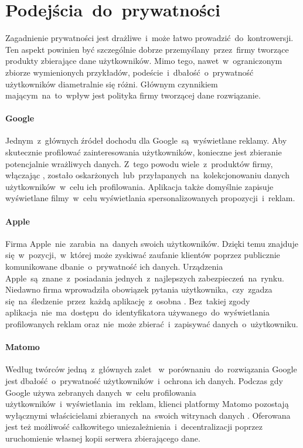 \section{Podejścia~do~prywatności}
Zagadnienie prywatności jest drażliwe~i~może łatwo prowadzić~do~kontrowersji. Ten aspekt powinien być szczególnie dobrze przemyślany~przez~firmy tworzące produkty zbierające dane użytkowników. Mimo tego, nawet~w~ograniczonym zbiorze wymienionych przykładów, podeście~i~dbałość~o~prywatność użytkowników diametralnie się różni. Głównym czynnikiem mającym~na~to~wpływ jest polityka firmy tworzącej dane rozwiązanie.

\paragraph{Google}
Jednym~z~głównych źródeł dochodu dla Google~są~wyświetlane reklamy. Aby skutecznie profilować zainteresowania użytkowników, konieczne jest zbieranie potencjalnie wrażliwych danych. Z~tego powodu wiele~z~produktów firmy, włączając , zostało oskarżonych~lub~przyłapanych~na~kolekcjonowaniu danych użytkowników~w~celu ich profilowania. Aplikacja  także domyślnie zapisuje wyświetlane filmy~w~celu wyświetlania spersonalizowanych propozycji~i~reklam.

\paragraph{Apple}
Firma Apple~nie~zarabia~na~danych swoich użytkowników. Dzięki temu znajduje się~w~pozycji,~w~której może zyskiwać zaufanie klientów poprzez publicznie komunikowane dbanie~o~prywatność ich danych. Urządzenia Apple~są~znane~z~posiadania jednych~z~najlepszych zabezpieczeń~na~rynku. Niedawno firma wprowadziła obowiązek pytania użytkownika,~czy~zgadza się~na~śledzenie~przez~każdą aplikację~z~osobna \cite{Apple_Ad_Transparency}. Bez~takiej zgody aplikacja~nie~ma~dostępu~do~identyfikatora używanego~do~wyświetlania profilowanych reklam oraz~nie~może zbierać~i~zapisywać danych~o~użytkowniku.

\paragraph{Matomo}
Według twórców jedną~z~głównych zalet ~w~porównaniu~do~rozwiązania Google jest dbałość~o~prywatność użytkowników~i~ochrona ich danych. Podczas gdy Google używa zebranych danych~w~celu profilowania użytkowników~i~wyświetlania~im~reklam, klienci platformy Matomo pozostają wyłącznymi właścicielami zbieranych~na~swoich witrynach danych \cite{Matomo_Data}. Oferowana jest też możliwość całkowitego uniezależnienia~i~decentralizacji poprzez uruchomienie własnej kopii serwera zbierającego dane.

